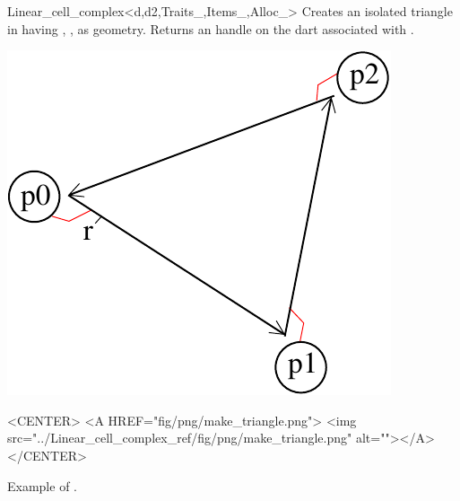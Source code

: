 \begin{ccRefClass}{Linear_cell_complex<d,d2,Traits_,Items_,Alloc_>}
{Creates an isolated triangle in  having , ,  as geometry.
   Returns an handle on the dart associated with .
}
%
\def\LargFig{.3\textwidth}
  \begin{ccTexOnly}
    \begin{center}
      \includegraphics[width=\LargFig]{Linear_cell_complex_ref/fig/pdf/make_triangle}
    \end{center}
  \end{ccTexOnly}
  \begin{ccHtmlOnly}
    <CENTER>
    <A HREF="fig/png/make_triangle.png">
        <img src="../Linear_cell_complex_ref/fig/png/make_triangle.png" alt=""></A>
    </CENTER>
    \end{ccHtmlOnly}
    \centerline{Example of .}


\end{ccRefClass}
